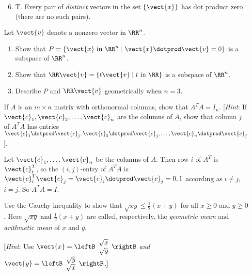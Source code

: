 \begin{multicols}{2}
\begin{ex}
\begin{sol}
\begin{enumerate}[label={\alph*.}]
\setcounter{enumi}{5}
\item  T. Every pair of \textit{distinct} vectors in the set $\{\vect{x}\}$ has dot product zero (there are no such pairs).

\end{enumerate}
\end{sol}
\end{ex}

\begin{ex}
Let $\vect{v}$ denote a nonzero vector in $\RR^n$.

\begin{enumerate}[label={\alph*.}]
\item Show that $P = \{\vect{x} \mbox{ in } \RR^n \mid \vect{x} \dotprod \vect{v} = 0\}$ is a subspace of $\RR^n$.

\item Show that $\RR\vect{v} = \{t\vect{v} \mid t  \mbox{ in }\RR\}$ is a subspace of $\RR^n$.

\item Describe $P$ and $\RR\vect{v}$ geometrically when $n = 3$.

\end{enumerate}
\end{ex}

\begin{ex}\label{ex:5.3.9}
If $A$ is an $m \times n$ matrix with orthonormal columns, show that $A^{T}A = I_{n}$. [\textit{Hint}: If $\vect{c}_{1}, \vect{c}_{2}, \dots, \vect{c}_{n}$ are the columns of $A$, show that column $j$ of $A^{T}A$ has entries $\vect{c}_{1} \dotprod \vect{c}_{j}, \vect{c}_{2} \dotprod \vect{c}_{j}, \dots, \vect{c}_{n} \dotprod \vect{c}_{j}$].

\begin{sol}
Let $\vect{c}_{1}, \dots, \vect{c}_{n}$ be the columns of $A$. Then row $i$ of $A^{T}$ is $\vect{c}_{i}^{T}$, so the $(i, j)$-entry of $A^{T}A$ is $\vect{c}_{i}^{T}\vect{c}_j = \vect{c}_{i} \dotprod \vect{c}_{j} = 0, 1$ according as $i \neq j$, $i = j$. So $A^{T}A = I$.
\end{sol}
\end{ex}

\begin{ex}
Use the Cauchy inequality to show that $\sqrt{xy} \leq \frac{1}{2}(x + y)$ for all $x \geq 0$ and $y \geq 0$. Here  $\sqrt{xy}$ and $\frac{1}{2}(x + y)$ are called, respectively, the \textit{geometric mean} and \textit{arithmetic mean} of $x$ and $y$.

[\textit{Hint}: Use 
$ \vect{x} = 
\leftB \begin{array}{r}
\sqrt{x} \\
\sqrt{y}
\end{array} \rightB
$
 \textit{and} 
$
\vect{y} = 
\leftB \begin{array}{r}
\sqrt{y} \\
\sqrt{x}
\end{array} \rightB
$.]
\end{ex}


\end{multicols}
